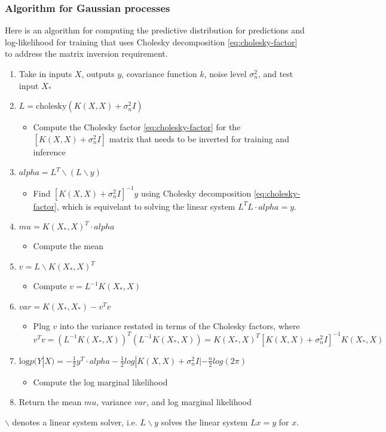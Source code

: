 \subsubsection{Algorithm for Gaussian processes}
Here is an algorithm for computing the predictive distribution for predictions and log-likelihood for training that uses Cholesky decomposition \ref{eq:cholesky-factor} to address the matrix inversion requirement.
\begin{enumerate}
    \item Take in inputs $X$, outputs $y$, covariance function $k$, noise level $\sigma^2_n$, and test input $X_*$
    \item $L = \text{cholesky}(K(X,X) + \sigma_n^2I)$
    \begin{itemize}
        \item Compute the Cholesky factor \ref{eq:cholesky-factor} for the $[K(X,X) + \sigma^2_nI]$ matrix that needs to be inverted for training and inference
    \end{itemize}
    \item $alpha = L^T \backslash (L \backslash y)$
    \begin{itemize}
        \item Find $[K(X,X) + \sigma^2_nI]^{-1}y$ using Cholesky decomposition \ref{eq:cholesky-factor}, which is equivelant to solving the linear system $L^T L \cdot alpha = y$.
    \end{itemize}
    \item $mu = K(X_*, X)^T \cdot alpha$
    \begin{itemize}
        \item Compute the mean
    \end{itemize}
    \item $v = L \backslash K(X_*, X)^T$
    \begin{itemize}
        \item Compute $v = L^{-1} K(X_*, X)$ 
    \end{itemize}
    \item $var = K(X_*, X_*) - v^T v$
    \begin{itemize}
        \item Plug $v$ into the variance restated in terms of the Cholesky factors, where $v^T v = (L^{-1} K(X_*, X))^T (L^{-1} K(X_*, X)) = K(X_*, X)^T [K(X,X) + \sigma^2_nI]^{-1} K(X_*, X)$ 
    \end{itemize}
    \item $\text{log} p(Y|X) = -\frac{1}{2}y^T \cdot alpha - \frac{1}{2}log|K(X,X) + \sigma^2_nI| - \frac{n}{2}log(2\pi)$
    \begin{itemize}
        \item Compute the log marginal likelihood 
    \end{itemize}
    \item Return the mean $mu$, variance $var$, and log marginal likelihood
\end{enumerate}
$\backslash$ denotes a linear system solver, i.e. $L \backslash y$ solves the linear system $Lx = y$ for $x$. 

